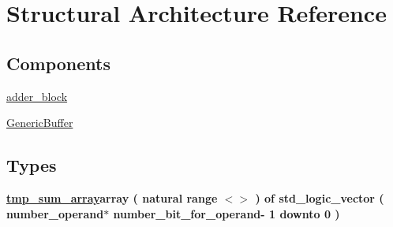 \hypertarget{classgeneric__adder__pipelined_1_1_structural}{\section{Structural Architecture Reference}
\label{classgeneric__adder__pipelined_1_1_structural}
}
\subsection*{Components}
 \begin{DoxyCompactItemize}
\item 
\hypertarget{classgeneric__adder__pipelined_1_1_structural_ga8246d08a486d28a27ac22b403f892e6e}{\hyperlink{group___majority_voter_ga8246d08a486d28a27ac22b403f892e6e}{adder\+\_\+block}  {\bfseries }  }\label{classgeneric__adder__pipelined_1_1_structural_ga8246d08a486d28a27ac22b403f892e6e}

\item 
\hypertarget{classgeneric__adder__pipelined_1_1_structural_ga26754353fa942392a9799290b42c41c7}{\hyperlink{group___majority_voter_ga26754353fa942392a9799290b42c41c7}{Generic\+Buffer}  {\bfseries }  }\label{classgeneric__adder__pipelined_1_1_structural_ga26754353fa942392a9799290b42c41c7}

\end{DoxyCompactItemize}
\subsection*{Types}
 \begin{DoxyCompactItemize}
\item 
\hypertarget{classgeneric__adder__pipelined_1_1_structural_ga53fbafb9ce3d3c16387cebcfd7c532b4}{{\bfseries \hyperlink{group___majority_voter_ga53fbafb9ce3d3c16387cebcfd7c532b4}{tmp\+\_\+sum\+\_\+array}{\bfseries \textcolor{vhdlchar}{array}\textcolor{vhdlchar}{ }\textcolor{vhdlchar}{(}\textcolor{vhdlchar}{ }\textcolor{vhdlchar}{natural}\textcolor{vhdlchar}{ }\textcolor{vhdlchar}{range}\textcolor{vhdlchar}{ }\textcolor{vhdlchar}{$<$$>$}\textcolor{vhdlchar}{ }\textcolor{vhdlchar}{)}\textcolor{vhdlchar}{ }\textcolor{vhdlchar}{ }\textcolor{vhdlchar}{of}\textcolor{vhdlchar}{ }\textcolor{vhdlchar}{std\+\_\+logic\+\_\+vector}\textcolor{vhdlchar}{ }\textcolor{vhdlchar}{(}\textcolor{vhdlchar}{ }\textcolor{vhdlchar}{ }\textcolor{vhdlchar}{ }\textcolor{vhdlchar}{ }\textcolor{vhdlchar}{number\+\_\+operand}\textcolor{vhdlchar}{$\ast$}\textcolor{vhdlchar}{ }\textcolor{vhdlchar}{ }\textcolor{vhdlchar}{ }\textcolor{vhdlchar}{number\+\_\+bit\+\_\+for\+\_\+operand}\textcolor{vhdlchar}{-\/}\textcolor{vhdlchar}{ } \textcolor{vhdldigit}{1} \textcolor{vhdlchar}{ }\textcolor{vhdlchar}{downto}\textcolor{vhdlchar}{ }\textcolor{vhdlchar}{ } \textcolor{vhdldigit}{0} \textcolor{vhdlchar}{ }\textcolor{vhdlchar}{)}\textcolor{vhdlchar}{ }}} }\label{classgeneric__adder__pipelined_1_1_structural_ga53fbafb9ce3d3c16387cebcfd7c532b4}

\end{DoxyCompactItemize}
